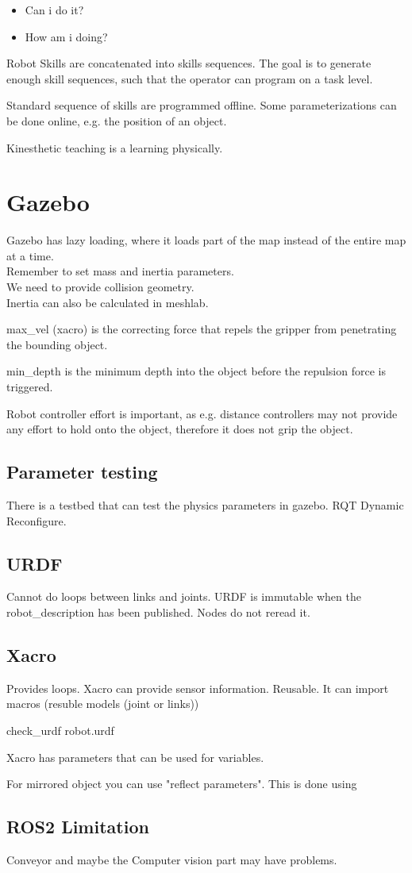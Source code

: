 \documentclass[a4paper]{article}
\begin{document}
\begin{itemize}
	\item Can i do it?
	\item How am i doing?
\end{itemize}

Robot Skills are concatenated into skills sequences. The goal is to generate enough skill sequences, such that the operator can program on a task level. 

Standard sequence of skills are programmed offline. Some parameterizations can be done online, e.g. the position of an object. 

Kinesthetic teaching is a learning physically. 

\section{Gazebo}
Gazebo has lazy loading, where it loads part of the map instead of the entire map at a time. \\
Remember to set mass and inertia parameters.\\
We need to provide collision geometry.\\
Inertia can also be calculated in meshlab.


max\_vel (xacro) is the correcting force that repels the gripper from penetrating the bounding object.

min\_depth is the minimum depth into the object before the repulsion force is triggered. 


Robot controller effort is important, as e.g. distance controllers may not provide any effort to hold onto the object, therefore it does not grip the object.


\subsection{Parameter testing}
There is a testbed that can test the physics parameters in gazebo. RQT Dynamic Reconfigure.

\subsection{URDF}
Cannot do loops between links and joints.
URDF is immutable when the robot\_description has been published. Nodes do not reread it.


\subsection{Xacro}
Provides loops.
Xacro can provide sensor information.
Reusable.
It can import macros (resuble models (joint or links))

check\_urdf robot.urdf

Xacro has parameters that can be used for variables.

For mirrored object you can use "reflect parameters". This is done using 


\subsection{ROS2 Limitation}
Conveyor and maybe the Computer vision part may have problems.
\end{document}
